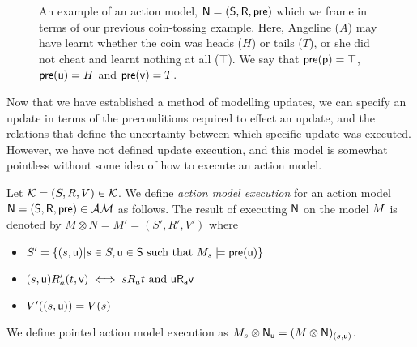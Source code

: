 \begin{figure}
\centering
{}
\caption[Action model example of coin-game update]{An example of an action model, $\mathrm{\mathsf{N}} = (\mathrm{\mathsf{S}},\mathrm{\mathsf{R}},\mathrm{\mathsf{pre}})$ which we frame in terms of our previous coin-tossing example.
Here, Angeline ($A$) may have learnt whether the coin was heads ($H$) or tails ($T$), or she did not
cheat and learnt nothing at all ($\top$).
We say that $\mathrm{\mathsf{pre}}(\mathrm{\mathsf{p}}) = \top$, $\mathrm{\mathsf{pre}}(\mathrm{\mathsf{u}}) = H$ and $\mathrm{\mathsf{pre}}(\mathrm{\mathsf{v}}) = T$.}
\label{figure:eventModelExample}
\end{figure}

Now that we have established a method of modelling updates, we can specify an update in terms of the
preconditions required to effect an update, and the relations that define the uncertainty between
which specific update was executed.
However, we have not defined update execution, and this model is somewhat pointless without some
idea of how to execute an action model.

\begin{defn} \label{evModelEx}
	Let $\mathcal{K} = (S, R, V) \in \mathcal{K}$. We define {\em action model
	execution} for an action model $\mathrm{\mathsf{\mathrm{\mathsf{N}} = (S,
		R, pre)}} \in
\mathcal{AM}$ as follows.
The result of executing $\mathrm{\mathsf{N}}$ on the model $M$ is denoted by $M \otimes N = M' = (S', R', V')$ where
\begin{itemize}
	\item $S' = \{(s,\mathrm{\mathsf{u}}) | s \in S, \mathrm{\mathsf{u \in
    S}} \text{ such that } M_s \models \mathrm{\mathsf{pre(u)}}\}$
	\item $(s, \mathrm{\mathsf{u}}) R_a' (t, \mathrm{\mathsf{v}}) \iff s R_a t \text{ and } \mathrm{\mathsf{u R_a v}}$
	\item $V'((s,\mathrm{\mathsf{u}})) = V(s)$
\end{itemize}
We define pointed action model execution as $M_s \otimes
\mathrm{\mathsf{\mathrm{\mathsf{N}}_u}}
= (M \otimes \mathrm{\mathsf{\mathrm{\mathsf{N}}}})_{(s, \mathrm{\mathsf{u}})}$.
\end{defn}

